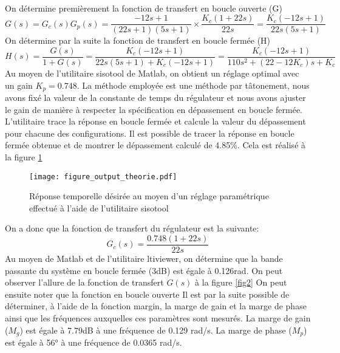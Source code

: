\paragraph{} On détermine premièrement la fonction de transfert en boucle ouverte (G)
\begin{equation}
G(s) = G_c(s) G_p(s) = 	\frac{-12s + 1}{(22s +1)(5s+1)} \times \frac{K_c (1 + 22s)}{22s} = \frac{K_c(-12s + 1)}{22s(5s + 1)}
\end{equation}
On détermine par la suite la fonction de transfert en boucle fermée (H)
\begin{equation}
H(s) = \frac{G(s)}{1 + G(s)} = \frac{K_c(-12s + 1)}{22s(5s+1) + K_c(-12s + 1)} = \frac{K_c(-12s + 1)}{110s^2 + (22 - 12K_c)s + K_c}
\end{equation} 
Au moyen de l'utilitaire sisotool de Matlab, on obtient un réglage optimal avec un gain $K_p = 0.748$. La méthode employée est une méthode par tâtonement, nous avons fixé la valeur de la constante de temps du régulateur et nous avons ajuster le gain de manière à respecter la spécification en dépassement en boucle fermée. L'utilitaire trace la réponse en boucle fermée et calcule la valeur du dépassement pour chacune des configurations. Il est possible de tracer la réponse en boucle fermée obtenue et de montrer le dépassement calculé de 4.85\%. Cela est réalisé à la figure \ref{fig1}
\begin{figure}[htbp]
\centering
\texttt{[image: figure\_output\_theorie.pdf]}
\caption{Réponse temporelle désirée au moyen d'un réglage paramétrique effectué à l'aide de l'utilitaire sisotool}
\label{fig1}
\end{figure}
On a donc que la fonction de transfert du régulateur est la suivante:
\begin{equation}
G_c(s) = \frac{0.748(1 + 22s)}{22s}
\end{equation} 
Au moyen de Matlab et de l'utilitaire ltiviewer, on détermine que la bande passante du système en boucle fermée (3dB) est égale à 0.126rad. On peut observer l'allure de la fonction de transfert $G(s)$ à la figure \ref{fig2} On peut ensuite noter que la fonction en boucle ouverte  Il est par la suite possible de déterminer, à l'aide de la fonction margin, la marge de gain et la marge de phase ainsi que les fréquences auxquelles ces paramètres sont mesurés. La marge de gain ($M_g$) est égale à 7.79dB à une fréquence de 0.129 rad/s. La marge de phase ($M_p$) est égale à 56° à une fréquence de 0.0365 rad/s.

